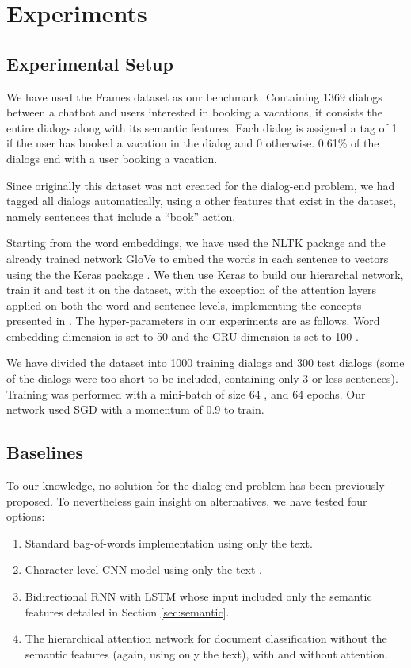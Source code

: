 \section{Experiments}\label{sec:exp}

\subsection{Experimental Setup}
We have used the Frames dataset \cite{frames} as 
our benchmark. Containing 1369 dialogs between 
a chatbot and users interested in booking a vacations, 
it consists the entire dialogs along with its semantic features. 
Each dialog is assigned a tag of 1 if the user has booked a vacation 
in the dialog and 0 otherwise. 0.61\% of the dialogs end with a user 
booking a vacation. 

Since originally this dataset was not created for the dialog-end problem, 
we had tagged all dialogs automatically, using a other features that exist 
in the dataset, namely sentences that include a ``book'' action. 

Starting from the word embeddings, we have used the 
NLTK package \cite{DBLP:conf/acl/Bird06} and the already trained network GloVe \cite{glove} 
to embed the words in each sentence to vectors using the the Keras package \cite{chollet2015}. 
We then use Keras to build our hierarchal network, train it and test it on the 
dataset, with the exception of the attention layers applied on both the word and sentence 
levels, implementing the concepts presented in \cite{attention,tc}. 
The hyper-parameters in our experiments are as follows. 
Word embedding dimension is set to 50  and the 
GRU dimension is set to 100 . 

We have divided the dataset into 1000 training dialogs and 300 test dialogs 
(some of the dialogs were too short to be included, containing only 3 or less sentences).
Training was performed with a mini-batch of size 64 , 
and 64  epochs.
Our network used SGD with a momentum of 0.9  to train.

\subsection{Baselines}
To our knowledge, no solution for the 
dialog-end problem has been previously proposed. To nevertheless
gain insight on alternatives, we have tested four 
options: 
\begin{enumerate}
	\item Standard bag-of-words implementation using only the text.\label{b:1}
	\item Character-level CNN model using only the text \cite{ZhangZL15}.\label{b:2}
	\item Bidirectional RNN with LSTM whose input included only the semantic features detailed in Section \ref{sec:semantic}.\label{b:3}
	\item The hierarchical attention network for document classification \cite{attention} without the semantic features (again, using only the text), with and without attention.\label{b:4}
\end{enumerate}

